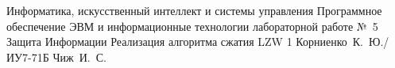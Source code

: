 \documentclass{bmstu}
\begin{document}
\makereporttitle
    {Информатика, искусственный интеллект и системы управления} %
    {Программное обеспечение ЭВМ и информационные технологии} %
    {лабораторной работе №~5} %
    {Защита Информации} %
    {Реализация алгоритма сжатия LZW} %
    {1} %
    {Корниенко~К.~Ю./ИУ7-71Б} %
    {Чиж~И.~С.} %

\maketableofcontents






\makebibliography
\end{document}
